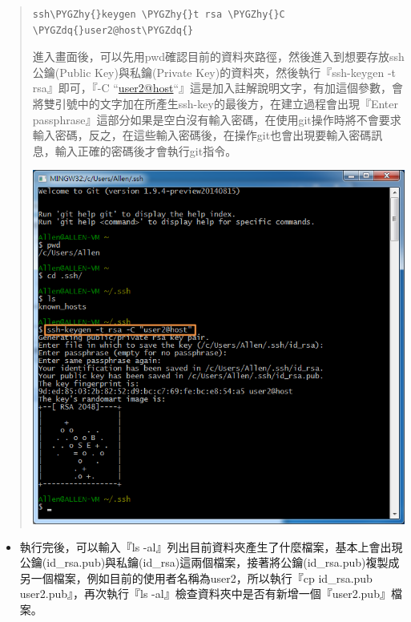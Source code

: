 \documentclass[letterpaper,10pt,english]{sphinxmanual}
\def\PYGZhy{\char`\-}
\def\PYGZdq{\char`\"}
\begin{document}
\begin{quote}

\begin{Verbatim}[commandchars=\\\{\}]
ssh\PYGZhy{}keygen \PYGZhy{}t rsa \PYGZhy{}C \PYGZdq{}user2@host\PYGZdq{}
\end{Verbatim}

進入畫面後，可以先用pwd確認目前的資料夾路徑，然後進入到想要存放ssh公鑰(Public Key)與私鑰(Private Key)的資料夾，然後執行『ssh-keygen -t rsa』即可，『-C ``\href{mailto:user2@host}{user2@host}``』這是加入註解說明文字，有加這個參數，會將雙引號中的文字加在所產生ssh-key的最後方，在建立過程會出現『Enter passphrase』這部分如果是空白沒有輸入密碼，在使用git操作時將不會要求輸入密碼，反之，在這些輸入密碼後，在操作git也會出現要輸入密碼訊息，輸入正確的密碼後才會執行git指令。

\includegraphics{gitBash-002.png}
\end{quote}
\begin{itemize}
\item {} 
執行完後，可以輸入『ls -al』列出目前資料夾產生了什麼檔案，基本上會出現公鑰(id\_rsa.pub)與私鑰(id\_rsa)這兩個檔案，接著將公鑰(id\_rsa.pub)複製成另一個檔案，例如目前的使用者名稱為user2，所以執行『cp id\_rsa.pub user2.pub』，再次執行『ls -al』檢查資料夾中是否有新增一個『user2.pub』檔案。

\end{itemize}
\end{document}
